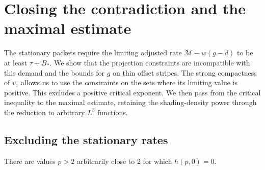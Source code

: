 \section{Closing the contradiction and the maximal estimate}
\label{sec:closure}

The stationary packets require the limiting adjusted rate
\(\mathcal M-w(g-d)\) to be at least \(\tau+B_*\).
We show that the projection constraints are incompatible with this demand
and the bounds for \(g\) on thin offset stripes.  The strong compactness of
\(v_1\) allows us to use the constraints on the sets where its limiting
value is positive.  This excludes a positive critical exponent.
We then pass from the critical inequality to the maximal estimate,
retaining the shading-density power through the reduction to arbitrary
\(L^3\) functions.

\subsection{Excluding the stationary rates}

\begin{proposition}
\label{prop:critical-vanishing}
There are values \(p>2\) arbitrarily close to \(2\) for which
\(h(p,0)=0\).
\end{proposition}

